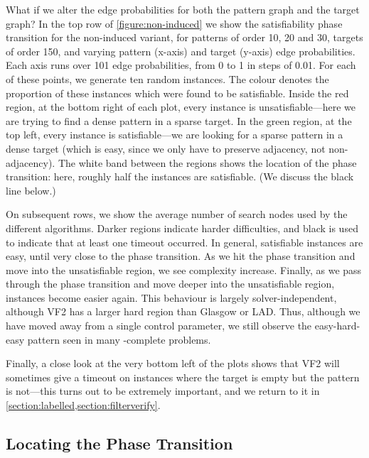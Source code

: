 \documentclass[twoside,11pt]{article}
\begin{document}
What if we alter the edge probabilities for both the pattern graph and the target graph?  In the top
row of \cref{figure:non-induced} we show the satisfiability phase transition for the non-induced
variant, for patterns of order 10, 20 and 30, targets of order 150, and varying pattern (x-axis) and
target (y-axis) edge probabilities. Each axis runs over 101 edge probabilities, from 0 to 1 in steps
of 0.01. For each of these points, we generate ten random instances. The colour denotes the
proportion of these instances which were found to be satisfiable.  Inside the red region, at the
bottom right of each plot, every instance is unsatisfiable---here we are trying to find a dense
pattern in a sparse target. In the green region, at the top left, every instance is
satisfiable---we are looking for a sparse pattern in a dense target (which is easy, since we only
have to preserve adjacency, not non-adjacency). The white band between the regions shows the
location of the phase transition: here, roughly half the instances are satisfiable. (We discuss the
black line below.)

On subsequent rows, we show the average number of search nodes used by the different algorithms.
Darker regions indicate harder difficulties, and black is used to indicate that at least one timeout
occurred. In general, satisfiable instances are easy, until very close to the phase transition. As
we hit the phase transition and move into the unsatisfiable region, we see complexity increase.
Finally, as we pass through the phase transition and move deeper into the unsatisfiable region,
instances become easier again. This behaviour is largely solver-independent, although VF2 has a
larger hard region than Glasgow or LAD. Thus, although we have moved away from a single control
parameter, we still observe the easy-hard-easy pattern seen in many \NP-complete problems.

Finally, a close look at the very bottom left of the plots shows that VF2 will sometimes give a
timeout on instances where the target is empty but the pattern is not---this turns out to be
extremely important, and we return to it in \cref{section:labelled,section:filterverify}.

\subsection{Locating the Phase Transition}
\end{document}
